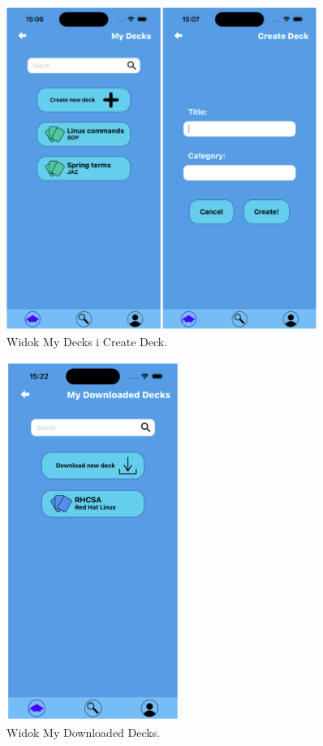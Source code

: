 \begin{figure}[H]
    \centering
    \includegraphics[width=0.9\textwidth]{chapters/chapter_10/images_mobile/mobile_my_decks}
    \caption{Widok My Decks i Create Deck.}
    \label{img:mobile_my_decks}
\end{figure}


\begin{figure}[H]
    \centering
    \includegraphics[width=0.5\textwidth]{chapters/chapter_10/images_mobile/mobile_my_decks_2}
    \caption{Widok My Downloaded Decks.}
    \label{img:mobile_my_decks_2}
\end{figure}


